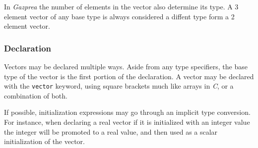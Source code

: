 \documentclass{article}
\begin{document}
		In \textit{Gazprea} the number of elements in the vector also determine its type. A 3 element vector of any base
		type is always considered a diffent type form a 2 element vector.

		\subsubsection{Declaration}

			Vectors may be declared multiple ways. Aside from any type specifiers, the base type of the vector is the
			first portion of the declaration. A vector may be declared with the \texttt{vector} keyword, using square
			brackets much like arrays in \textit{C}, or a combination of both.

			If possible, initialization expressions may go through an implicit type conversion. For instance, when
			declaring a real vector if it is initialized with an integer value the integer will be promoted to a real
			value, and then used as a scalar initialization of the vector.
\end{document}
